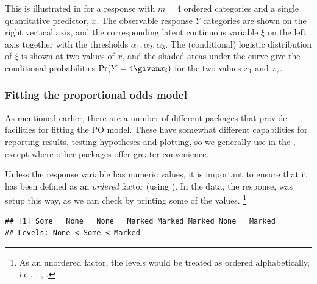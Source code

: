 \documentclass[11pt]{book}
\renewenvironment{knitrout}{\small\renewcommand{\baselinestretch}{.85}}{} %
\begin{document}
This is illustrated in  for a response with $m=4$ 
ordered categories and a single quantitative predictor, $x$.  The observable
response $Y$ categories are shown on the right vertical axis, and the
corresponding latent continuous variable $\xi$ on the left axis
together with the thresholds $\alpha_1, \alpha_2, \alpha_3$.
The (conditional) logistic distribution of $\xi$ is shown at two values  
of $x$, and the shaded areas under the curve give the conditional probabilities
$\Pr (Y=4 \given x_i)$ for the two values $x_1$ and $x_2$.


\subsubsection{Fitting the proportional odds model}

As mentioned earlier, there are a number of different \R packages that
provide facilities for fitting the PO model. These have somewhat different
capabilities for reporting results, testing hypotheses and plotting,
so we generally use  in the , except where
other packages offer greater convenience.

Unless the response variable has numeric values, it is important to ensure
that it has been defined as an \emph{ordered} factor (using ).
In the  data, the response,  was setup this
way, as we can check by printing some of the values.%
\footnote{
As an unordered factor, the levels would be treated as ordered alphabetically, i.e.,
, , .
}
\begin{knitrout}
\color{fgcolor}\begin{kframe}
\begin{alltt}
\hlopt{$} \hlstd{)}
\end{alltt}
\begin{verbatim}
## [1] Some   None   None   Marked Marked Marked None   Marked
## Levels: None < Some < Marked
\end{verbatim}
\end{kframe}
\end{knitrout}
\end{document}
